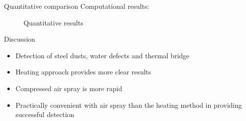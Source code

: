 \begin{frame}{Quantitative comparison}
Computational results:

    \begin{figure}
        \hspace*{-20pt}
        \caption{Quantitative results}

    \end{figure}
\end{frame}


\begin{frame}{Discussion}
    \begin{itemize}[<+->]
    \pause
    \large
        \item Detection of steel dusts, water defects and thermal bridge 
        \item Heating approach provides more clear results
        \item Compressed air spray is more rapid  
        \item Practically convenient with air spray than the heating method in providing successful detection
    \end{itemize}
\end{frame}
